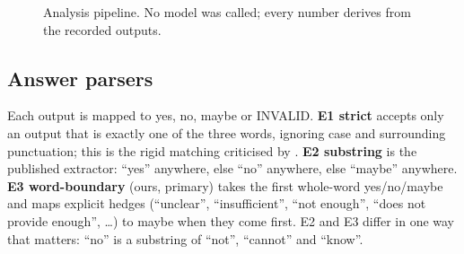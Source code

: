 \documentclass[acmsmall]{acmart}
\begin{document}
\begin{figure}[t]
\centering
{}
\caption{Analysis pipeline. No model was called; every number derives from the recorded outputs.}\label{fig:pipeline}
\end{figure}

\subsection{Answer parsers}\label{sec:parsers}
Each output is mapped to yes, no, maybe or INVALID. \textbf{E1 strict} accepts only an output that is exactly one of the three words, ignoring case and surrounding punctuation; this is the rigid matching criticised by \cite{hua2025flaw}. \textbf{E2 substring} is the published extractor: ``yes'' anywhere, else ``no'' anywhere, else ``maybe'' anywhere. \textbf{E3 word-boundary} (ours, primary) takes the first whole-word yes/no/maybe and maps explicit hedges (``unclear'', ``insufficient'', ``not enough'', ``does not provide enough'', \ldots) to maybe when they come first. E2 and E3 differ in one way that matters: ``no'' is a substring of ``not'', ``cannot'' and ``know''.
\end{document}

